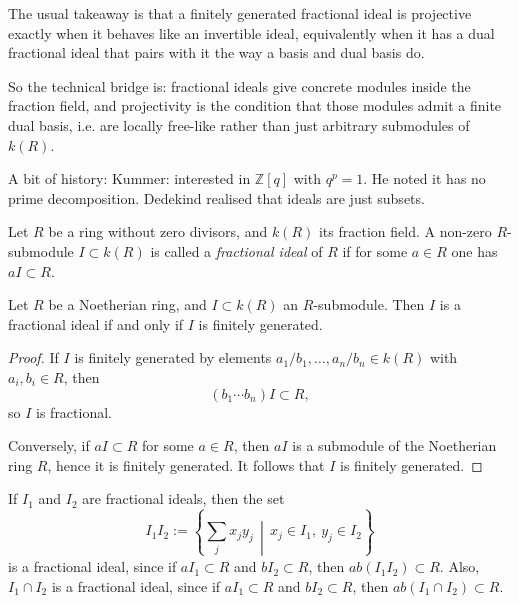 \medskip\noindent
The usual takeaway is that a finitely
generated fractional ideal is projective
exactly when it behaves like an invertible
ideal, equivalently when it has a dual
fractional ideal that pairs with it the way a
basis and dual basis do.

\medskip\noindent
So the technical bridge is: fractional ideals
give concrete modules inside the fraction
field, and projectivity is the condition that
those modules admit a finite dual basis, i.e.
are locally free-like rather than just
arbitrary submodules of $k(R)$.

\medskip\noindent
A bit of history: Kummer: interested in $
\mathbb{Z}[q]$ with $q^p=1$.
He noted it has no prime decomposition.
Dedekind realised that
ideals are just subsets.



\begin{definition}
\label{definition-fractional-ideal}
Let $R$ be a ring without zero divisors,
and $k(R)$ its fraction field. A non-zero
$R$-submodule $I\subset k(R)$ is called a
{\it fractional ideal} of $R$ if for some
$a\in R$ one has $aI\subset R$.
\end{definition}

\begin{lemma}
\label{lemma-fractional-ideal-noetherian}
Let $R$ be a Noetherian ring, and
$I\subset k(R)$ an $R$-submodule. Then $I$
is a fractional ideal if and only if $I$ is
finitely generated.
\end{lemma}

\begin{proof}
If $I$ is finitely generated by elements
$a_1/b_1,\ldots,a_n/b_n\in k(R)$ with
$a_i,b_i\in R$, then
$$
(b_1\cdots b_n)I\subset R,
$$
so $I$ is fractional.

Conversely, if $aI\subset R$ for some
$a\in R$, then $aI$ is a submodule of the
Noetherian ring $R$, hence it is finitely
generated. It follows that $I$ is finitely
generated.
\end{proof}

\begin{remark}
\label{remark-fractional-product}
If $I_1$ and $I_2$ are fractional ideals,
then the set
$$
I_1I_2:=\left\{\sum_j x_jy_j \,\middle|\,
x_j\in I_1,\ y_j\in I_2\right\}
$$
is a fractional ideal, since if
$aI_1\subset R$ and $bI_2\subset R$, then
$ab(I_1I_2)\subset R$.
Also, $I_1\cap I_2$ is a fractional ideal,
since if $aI_1\subset R$ and $bI_2\subset R$,
then $ab(I_1\cap I_2)\subset R$.
\end{remark}

